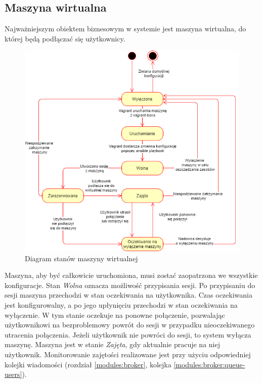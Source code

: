 \documentclass[../opis-rozwiazania.tex]{subfiles}
\begin{document}
\label{state_diagrams}

\subsection{Maszyna wirtualna}
Najważniejszym obiektem biznesowym w systemie jest maszyna wirtualna, do której będą podłączać się użytkownicy.

\begin{figure}[H]
  \centering
  \includegraphics[width=\textwidth]{../diagrams/state_diagrams/virtual_machine.png}
  \caption{Diagram stanów maszyny wirtualnej}
  \label{state_vm}
\end{figure}

Maszyna, aby być całkowicie uruchomiona, musi zostać zaopatrzona we wszystkie konfiguracje.
Stan \textit{Wolna} oznacza możliwość przypisania sesji.
Po przypisaniu do sesji maszyna przechodzi w stan oczekiwania na użytkownika.
Czas oczekiwania jest konfigurowalny, a po jego upłynięciu przechodzi w stan oczekiwania na wyłączenie.
W tym stanie oczekuje na ponowne połączenie, pozwalając użytkownikowi na bezproblemowy powrót do sesji w przypadku nieoczekiwanego utracenia połączenia.
Jeżeli użytkownik nie powróci do sesji, to system wyłącza maszynę.
Maszyna jest w stanie \textit{Zajęta}, gdy aktualnie pracuje na niej użytkownik. Monitorowanie zajętości realizowane jest przy użyciu odpowiedniej kolejki wiadomości (rozdział \ref{modules:broker}, kolejka \ref{modules:broker:queue-users}).
\end{document}
